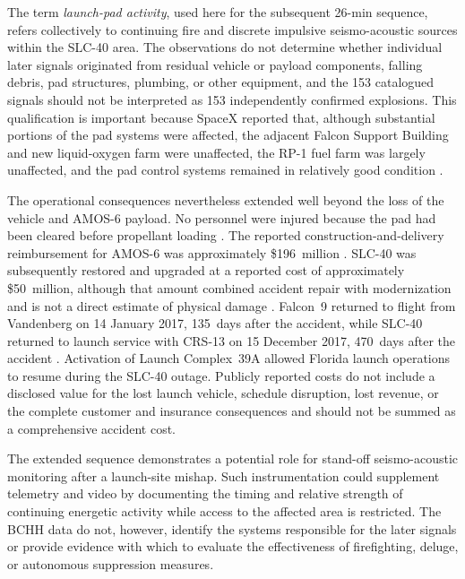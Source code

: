\documentclass[]{seismica}
\begin{document}
The term \emph{launch-pad activity}, used here for the subsequent 26-min
sequence, refers collectively to continuing fire and discrete impulsive
seismo-acoustic sources within the SLC-40 area. The observations do not
determine whether individual later signals originated from residual vehicle or
payload components, falling debris, pad structures, plumbing, or other
equipment, and the 153 catalogued signals should not be interpreted as 153
independently confirmed explosions. This qualification is important because
SpaceX reported that, although substantial portions of the pad systems were
affected, the adjacent Falcon Support Building and new liquid-oxygen farm were
unaffected, the RP-1 fuel farm was largely unaffected, and the pad control
systems remained in relatively good condition
\citep{spacex_anomaly_2017}.

The operational consequences nevertheless extended well beyond the loss of the
vehicle and AMOS-6 payload. No personnel were injured because the pad had been
cleared before propellant loading \citep{spacex_anomaly_2017}. The reported
construction-and-delivery reimbursement for AMOS-6 was approximately
\$196~million \citep{magan_amos6_2016}. SLC-40 was subsequently restored and
upgraded at a reported cost of approximately \$50~million, although that amount
combined accident repair with modernization and is not a direct estimate of
physical damage \citep{clark_slc40_2017}. Falcon~9 returned to flight from
Vandenberg on 14 January 2017, 135~days after the accident, while SLC-40
returned to launch service with CRS-13 on 15 December 2017, 470~days after the
accident \citep{spacex_iridium1_2017,spacex_crs13_2017}. Activation of Launch
Complex~39A allowed Florida launch operations to resume during the SLC-40
outage. Publicly reported costs do not include a disclosed value for the lost
launch vehicle, schedule disruption, lost revenue, or the complete customer
and insurance consequences and should not be summed as a comprehensive
accident cost.

The extended sequence demonstrates a potential role for stand-off
seismo-acoustic monitoring after a launch-site mishap. Such instrumentation
could supplement telemetry and video by documenting the timing and relative
strength of continuing energetic activity while access to the affected area is
restricted. The BCHH data do not, however, identify the systems responsible for
the later signals or provide evidence with which to evaluate the effectiveness
of firefighting, deluge, or autonomous suppression measures.
\end{document}
